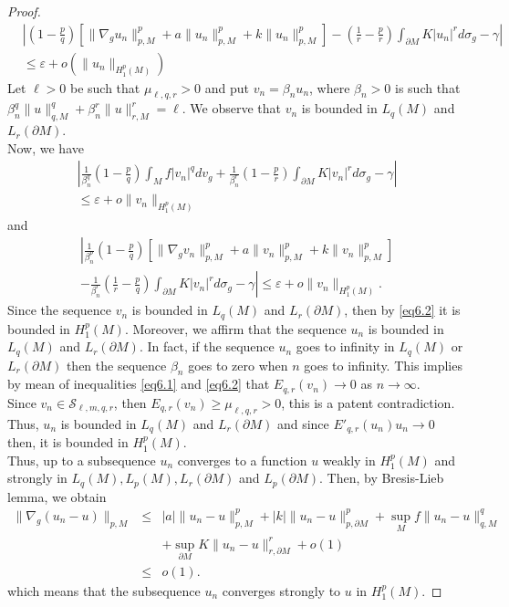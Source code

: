 \documentclass{Tran-l}
\theoremstyle{definition}
\theoremstyle{remark}
\numberwithin{equation}{section}
\begin{document}
\begin{proof}
\begin{eqnarray*}
&\left|\left(1-\frac{p}{q}\right)
\left[\|\nabla_gu_n\|_{p,M}^p+a\|u_n\|_{p,M}^p+k\|u_n\|_{p,M}^p\right]
-\left(\frac{1}{r}-\frac{p}{r}\right)\int_{\partial
M}K|u_n|^rd\sigma_g-\gamma\right|&\\&\leq\varepsilon+o(\|u_n\|_{H^p_1(M)})&
    \end{eqnarray*}
Let $\ell>0$ be such that $\mu_{\ell,q,r}>0$ and put $v_n=\beta_{n}
u_n$, where $\beta_n>0$ is such that
$\beta_{n}^q\|u\|_{q,M}^q+\beta_{n}^r\|u\|_{r,M}^r=\ell$. We observe
that
$v_n$ is bounded in $L_q(M)$ and $L_{r}(\partial M)$.\\
Now, we have
\begin{eqnarray}\label{eq6.1}
 \nonumber
&\left|\frac{1}{\beta_n^q}\left(1-\frac{p}{q}\right)\int_Mf|v_n|^qdv_g+
\frac{1}{\beta_n^r}\left(1-\frac{p}{r}\right)\int_{\partial
M}K|v_n|^rd\sigma_g-\gamma\right|\\&\leq \varepsilon
+o\|v_n\|_{H^p_1(M)}&
\end{eqnarray}
and
\begin{eqnarray}\label{eq6.2}
  \nonumber
&\left|\frac{1}{\beta_n^p}\left(1-\frac{p}{q}\right)
\left[\|\nabla_gv_n\|_{p,M}^p+a\|v_n\|_{p,M}^p+k
\|v_n\|_{p,M}^p\right]\right.\\&\left.
-\frac{1}{\beta_n^r}\left(\frac{1}{r}-\frac{p}{q}\right)
\int_{\partial M}K|v_n|^rd\sigma_g-\gamma\right|\leq\varepsilon+
o\|v_n\|_{H^p_1(M)}.&
\end{eqnarray}
Since the sequence $v_n $ is bounded in $L_q(M)$ and $L_r(\partial
M)$, then by \eqref{eq6.2} it is bounded in $H_1^p(M)$. Moreover, we
affirm that the sequence $u_n$ is bounded in $L_q(M)$ and
$L_r(\partial M)$. In fact, if the sequence $u_n$ goes to infinity
in $L_q(M)$ or $L_r(\partial M) $ then the sequence $\beta_n$ goes
to zero when $n$ goes to infinity. This implies by mean of
inequalities \eqref{eq6.1} and \eqref{eq6.2} that
$E_{q,r}(v_n)\rightarrow0$ as $n\rightarrow\infty$.\\
Since $v_n\in{\mathcal{S}}_{\ell,m,q,r}$, then
$E_{q,r}(v_n)\geq\mu_{\ell,q,r}>0$, this is a patent contradiction.
 Thus, $u_n$ is bounded in $L_q(M)$ and $L_r(\partial M)$
 and since $E'_{q,r}(u_n)u_n\longrightarrow0$ then, it is bounded in $H^p_1(M)$.\\
Thus, up to a subsequence $u_n$ converges  to a function $u$ weakly
 in $H^p_1(M)$ and  strongly in $L_q(M),L_p(M),L_r(\partial M)$ and
$L_p(\partial M)$. Then, by Bresis-Lieb lemma, we obtain
\begin{eqnarray*}
\|\nabla_g(u_n-u)\|_{p,M}&\leq&|a|\|u_n-u\|_{p,M}^p+|k|\|u_n-u\|_{p,\partial
M}^p+\sup_Mf\|u_n-u\|_{q,M}^q\\ &&+\sup_{\partial
M}K\|u_n-u\|_{r,\partial M}^r+o(1)\\&\leq& o(1).
\end{eqnarray*}
which means that the subsequence $u_n$ converges strongly to $u$ in
$H^p_1(M)$.
\end{proof}
\end{document}
